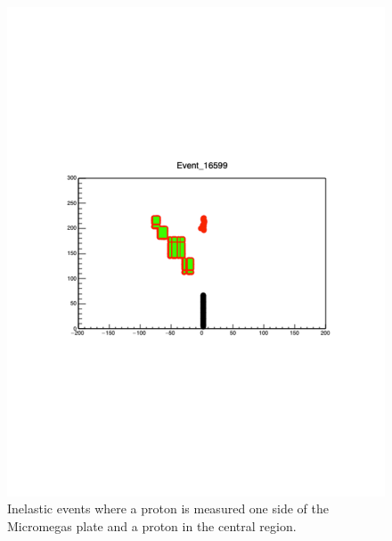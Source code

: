 \documentclass[final,number,sort&compress,5p,times,twocolumn]{elsarticle}
\begin{document}
\begin{figure}[hbt!]
  		\includegraphics[width=1.0\linewidth]{figures/9C_Inelastic_Central_2}

	\caption{Inelastic events where a proton is measured one side of the Micromegas plate and a proton in the central region.}
	\label{fig:9C_Inelastic_Center}
\end{figure}
\end{document}
